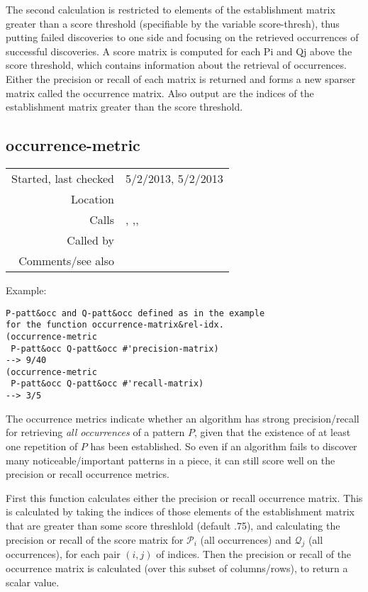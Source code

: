 The second calculation is restricted to elements of
the establishment matrix greater than a score
threshold (specifiable by the variable score-thresh),
thus putting failed discoveries to one side and
focusing on the retrieved occurrences of successful
discoveries. A score matrix is computed for each Pi
and Qj above the score threshold, which contains
information about the retrieval of occurrences. Either
the precision or recall of each matrix is returned and
forms a new sparser matrix called the occurrence
matrix. Also output are the indices of the
establishment matrix greater than the score
threshold.


\subsection*{occurrence-metric}\label{fun:occurrence-metric}

\vspace{0.3cm}
\begin{tabular}{r|p{8cm}}
Started, last checked & 5/2/2013, 5/2/2013 \\
Location & \nameref{sec:robust-metrics} \\
Calls & \nameref{fun:cardinality-score}, \nameref{fun:nth-list-of-lists},\newline \nameref{fun:precision-matrix}, \nameref{fun:occurrence-matrixnrel-idx} \\
Called by & \nameref{fun:occurrence-matrixnrel-idx} \\
Comments/see also &
\end{tabular}

\vspace{0.5cm}
\noindent Example:
\begin{verbatim}
P-patt&occ and Q-patt&occ defined as in the example
for the function occurrence-matrix&rel-idx.
(occurrence-metric
 P-patt&occ Q-patt&occ #'precision-matrix)
--> 9/40
(occurrence-metric
 P-patt&occ Q-patt&occ #'recall-matrix)
--> 3/5
\end{verbatim}

\noindent The occurrence metrics indicate whether
an algorithm has strong precision/recall for
retrieving \emph{all occurrences} of a pattern $P$,
given that the existence of at least one repetition of
$P$ has been established. So even if an algorithm
fails to discover many noticeable/important patterns
in a piece, it can still score well on the precision
or recall occurrence metrics.

First this function calculates either the precision or
recall occurrence matrix. This is calculated by taking
the indices of those elements of the establishment
matrix that are greater than some score threshlold
(default .75), and calculating the precision or recall
of the score matrix for $\mathcal{P}_i$ (all
occurrences) and $\mathcal{Q}_j$ (all occurrences),
for each pair $(i, j)$ of indices. Then the precision
or recall of the occurrence matrix is calculated (over
this subset of columns/rows), to return a scalar
value.


